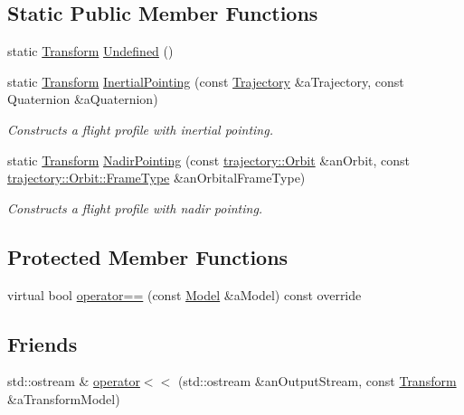 \subsection*{Static Public Member Functions}
\begin{DoxyCompactItemize}
\item 
static \hyperlink{classostk_1_1astro_1_1flight_1_1profile_1_1models_1_1_transform}{Transform} \hyperlink{classostk_1_1astro_1_1flight_1_1profile_1_1models_1_1_transform_a06ac043e7d6577f51578fc14331e1c6d}{Undefined} ()
\item 
static \hyperlink{classostk_1_1astro_1_1flight_1_1profile_1_1models_1_1_transform}{Transform} \hyperlink{classostk_1_1astro_1_1flight_1_1profile_1_1models_1_1_transform_ad09043542f34243cfa200d74db5c47bf}{Inertial\+Pointing} (const \hyperlink{classostk_1_1astro_1_1_trajectory}{Trajectory} \&a\+Trajectory, const Quaternion \&a\+Quaternion)
\begin{DoxyCompactList}\small\item\em Constructs a flight profile with inertial pointing. \end{DoxyCompactList}\item 
static \hyperlink{classostk_1_1astro_1_1flight_1_1profile_1_1models_1_1_transform}{Transform} \hyperlink{classostk_1_1astro_1_1flight_1_1profile_1_1models_1_1_transform_a45cbb8066c7a6c56774746c3ea025c8d}{Nadir\+Pointing} (const \hyperlink{classostk_1_1astro_1_1trajectory_1_1_orbit}{trajectory\+::\+Orbit} \&an\+Orbit, const \hyperlink{classostk_1_1astro_1_1trajectory_1_1_orbit_a1cc449ad56374471a8ab4300dde979e7}{trajectory\+::\+Orbit\+::\+Frame\+Type} \&an\+Orbital\+Frame\+Type)
\begin{DoxyCompactList}\small\item\em Constructs a flight profile with nadir pointing. \end{DoxyCompactList}\end{DoxyCompactItemize}
\subsection*{Protected Member Functions}
\begin{DoxyCompactItemize}
\item 
virtual bool \hyperlink{classostk_1_1astro_1_1flight_1_1profile_1_1models_1_1_transform_ad49694ca5cfb4fabf17ac063d9953fb0}{operator==} (const \hyperlink{classostk_1_1astro_1_1flight_1_1profile_1_1_model}{Model} \&a\+Model) const override
\end{DoxyCompactItemize}
\subsection*{Friends}
\begin{DoxyCompactItemize}
\item 
std\+::ostream \& \hyperlink{classostk_1_1astro_1_1flight_1_1profile_1_1models_1_1_transform_a31ed56d1b0b19d8f7363743664717403}{operator$<$$<$} (std\+::ostream \&an\+Output\+Stream, const \hyperlink{classostk_1_1astro_1_1flight_1_1profile_1_1models_1_1_transform}{Transform} \&a\+Transform\+Model)
\end{DoxyCompactItemize}


